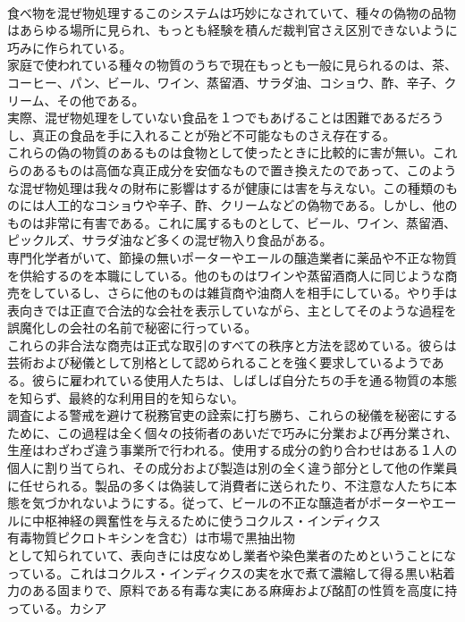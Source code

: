 \documentclass[8pt]{extreport}
\begin{document}
\begin{CJK}{UTF8}{min}
\\	食べ物を混ぜ物処理するこのシステムは巧妙になされていて、種々の偽物の品物はあらゆる場所に見られ、もっとも経験を積んだ裁判官さえ区別できないように巧みに作られている。
\\	家庭で使われている種々の物質のうちで現在もっとも一般に見られるのは、茶、コーヒー、パン、ビール、ワイン、蒸留酒、サラダ油、コショウ、酢、辛子、クリーム、その他である。
\\	実際、混ぜ物処理をしていない食品を１つでもあげることは困難であるだろうし、真正の食品を手に入れることが殆ど不可能なものさえ存在する。
\\	これらの偽の物質のあるものは食物として使ったときに比較的に害が無い。これらのあるものは高価な真正成分を安価なもので置き換えたのであって、このような混ぜ物処理は我々の財布に影響はするが健康には害を与えない。この種類のものには人工的なコショウや辛子、酢、クリームなどの偽物である。しかし、他のものは非常に有害である。これに属するものとして、ビール、ワイン、蒸留酒、ピックルズ、サラダ油など多くの混ぜ物入り食品がある。
\\	専門化学者がいて、節操の無いポーターやエールの醸造業者に薬品や不正な物質を供給するのを本職にしている。他のものはワインや蒸留酒商人に同じような商売をしているし、さらに他のものは雑貨商や油商人を相手にしている。やり手は表向きでは正直で合法的な会社を表示していながら、主としてそのような過程を誤魔化しの会社の名前で秘密に行っている。
\\	これらの非合法な商売は正式な取引のすべての秩序と方法を認めている。彼らは芸術および秘儀として別格として認められることを強く要求しているようである。彼らに雇われている使用人たちは、しばしば自分たちの手を通る物質の本態を知らず、最終的な利用目的を知らない。
\\	調査による警戒を避けて税務官吏の詮索に打ち勝ち、これらの秘儀を秘密にするために、この過程は全く個々の技術者のあいだで巧みに分業および再分業され、生産はわざわざ違う事業所で行われる。使用する成分の釣り合わせはある１人の個人に割り当てられ、その成分および製造は別の全く違う部分として他の作業員に任せられる。製品の多くは偽装して消費者に送られたり、不注意な人たちに本態を気づかれないようにする。従って、ビールの不正な醸造者がポーターやエールに中枢神経の興奮性を与えるために使うコクルス・インディクス
\\	有毒物質ピクロトキシンを含む）は市場で黒抽出物
\\	として知られていて、表向きには皮なめし業者や染色業者のためということになっている。これはコクルス・インディクスの実を水で煮て濃縮して得る黒い粘着力のある固まりで、原料である有毒な実にある麻痺および酩酊の性質を高度に持っている。カシア

\end{CJK}
\end{document}

